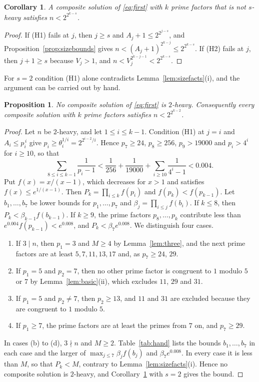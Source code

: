 \documentclass[screen,reqno]{aomart}
\numberwithin{equation}{section}
\theoremstyle{plain}
\newtheorem{proposition}[theorem]{Proposition}
\newtheorem{corollary}[theorem]{Corollary}
\theoremstyle{definition}
\theoremstyle{remark}
\begin{document}
\begin{corollary}\label{cor:light}
A composite solution of \eqref{eq:first} with $k$ prime factors that
is not $s$-heavy satisfies $n<2^{2^{k-s}}$.
\end{corollary}

\begin{proof}
If (H1) fails at $j$, then $j\ge s$ and $A_j+1\le2^{2^{j-s}}$, and
Proposition~\ref{prop:sizebounds} gives
$n<(A_j+1)^{2^{k-j}}\le2^{2^{k-s}}$. If (H2) fails at $j$, then
$j+1\ge s$ because $V_j>1$, and $n<V_j^{2^{k-j-1}}<2^{2^{k-s}}$.
\end{proof}

For $s=2$ condition (H1) alone contradicts
Lemma~\ref{lem:sizefacts}(i), and the argument can be carried out by
hand.

\begin{proposition}\label{prop:hand}
No composite solution of \eqref{eq:first} is $2$-heavy. Consequently
every composite solution with $k$ prime factors satisfies
$n<2^{2^{k-2}}$.
\end{proposition}

\begin{proof}
Let $n$ be $2$-heavy, and let $1\le i\le k-1$. Condition (H1) at $j=i$
and $A_i\le p_i^{\,i}$ give $p_i\ge\theta_i^{1/i}=2^{2^{i-2}/i}$. Hence
$p_7\ge24$, $p_8\ge256$, $p_9>19000$ and $p_i>4^i$ for $i\ge10$, so
that
\[
  \sum_{8\le i\le k-1}\frac1{p_i-1}<\frac1{256}+\frac1{19000}
  +\sum_{i\ge10}\frac1{4^i-1}<0.004 .
\]
Put $f(x)=x/(x-1)$, which decreases for $x>1$ and satisfies
$f(x)\le e^{1/(x-1)}$. Then $P_k=\prod_{i\le k}f(p_i)$ and
$f(p_k)<f(p_{k-1})$. Let $b_1,\dots,b_7$ be lower bounds for
$p_1,\dots,p_7$ and $\beta_j=\prod_{i\le j}f(b_i)$. If $k\le8$, then
$P_k<\beta_{k-1}f(b_{k-1})$. If $k\ge9$, the prime factors
$p_8,\dots,p_k$ contribute less than $e^{0.004}f(p_{k-1})<e^{0.008}$,
and $P_k<\beta_7e^{0.008}$. We distinguish four cases.
\begin{enumerate}[label=(\alph*)]
\item If $3\mid n$, then $p_1=3$ and $M\ge4$ by Lemma~\ref{lem:three},
  and the next prime factors are at least $5,7,11,13,17$ and, as
  $p_7\ge24$, $29$.
\item If $p_1=5$ and $p_2=7$, then no other prime factor is congruent
  to $1$ modulo $5$ or $7$ by Lemma~\ref{lem:basic}(ii), which excludes
  $11$, $29$ and $31$.
\item If $p_1=5$ and $p_2\ne7$, then $p_2\ge13$, and $11$ and $31$ are
  excluded because they are congruent to $1$ modulo $5$.
\item If $p_1\ge7$, the prime factors are at least the primes from $7$
  on, and $p_7\ge29$.
\end{enumerate}
In cases (b) to (d), $3\nmid n$ and $M\ge2$. Table~\ref{tab:hand}
lists the bounds $b_1,\dots,b_7$ in each case and the larger of
$\max_{j\le7}\beta_jf(b_j)$ and $\beta_7e^{0.008}$. In every case it is
less than $M$, so that $P_k<M$, contrary to
Lemma~\ref{lem:sizefacts}(i). Hence no composite solution is
$2$-heavy, and Corollary~\ref{cor:light} with $s=2$ gives the bound.
\end{proof}
\end{document}
